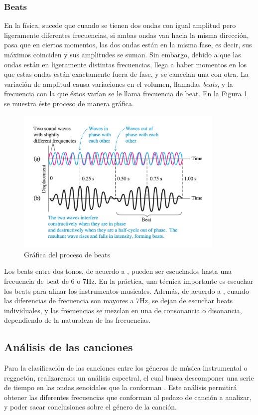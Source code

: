 \documentclass[12pt, letterpaper]{article}
\begin{document}
\subsubsection{Beats}
En la física, sucede que cuando se tienen dos ondas con igual amplitud pero ligeramente diferentes frecuencias, si ambas ondas van hacia la 
misma dirección, pasa que en ciertos momentos, las dos ondas están en la misma fase, es decir, sus máximos coinciden y sus amplitudes se suman. Sin embargo, 
debido a que las ondas están en ligeramente distintas frecuencias, llega a haber momentos en los que estas ondas están 
exactamente fuera de fase, y se cancelan una con otra. La variación de amplitud causa variaciones en el volumen, llamadas \textit{beats}, y la frecuencia 
con la que éstos varían se le llama frecuencia de beat. En la Figura \ref{beats-grafica} se muestra éste proceso de manera gráfica.
\begin{figure}[H]
  \centering
  \includegraphics[height = 7cm]{beats-grafica.png}
  \caption{Gráfica del proceso de beats}
  \label{beats-grafica}
\end{figure}Los beats entre dos tonos, de acuerdo a \cite{university-physics}, pueden ser escuchados hasta una frecuencia de beat de 6 o 7Hz. En la práctica, 
una técnica importante es escuchar los beats para afinar los instrumentos musicales. Además, de acuerdo a \cite{university-physics}, cuando las diferencias de 
frecuencia son mayores a 7Hz, se dejan de escuchar beats individuales, y las frecuencias se mezclan en una de consonancia o disonancia, dependiendo de la 
naturaleza de las frecuencias. 
\subsection{Análisis de las canciones}

Para la clasificación de las canciones entre los géneros de música instrumental o reggaetón,
realizaremos un análisis espectral, el cual busca descomponer una serie de tiempo en las
ondas senoidales que la conforman \cite{Montenegro-2009}. Este análisis permitirá obtener las
diferentes frecuencias que conforman al pedazo de canción a analizar, y poder sacar conclusiones
sobre el género de la canción. \medskip
\end{document}
